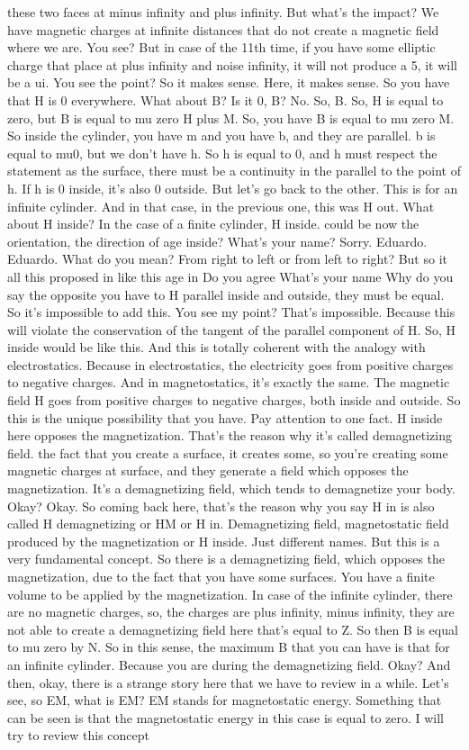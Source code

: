 these two faces at minus infinity and plus infinity. But what's the impact? We have magnetic charges at infinite distances that do not create a magnetic field where we are. You see? But in case of the 11th time, if you have some elliptic charge that place at plus infinity and noise infinity, it will not produce a 5, it will be a ui. You see the point? So it makes sense. Here, it makes sense. So you have that H is 0 everywhere. What about B? Is it 0, B? No. So, B. So, H is equal to zero, but B is equal to mu zero H plus M. So, you have B is equal to mu zero M. So inside the cylinder, you have m and you have b, and they are parallel. b is equal to mu0, but we don't have h. So h is equal to 0, and h must respect the statement as the surface, there must be a continuity in the parallel to the point of h. If h is 0 inside, it's also 0 outside. But let's go back to the other. This is for an infinite cylinder. And in that case, in the previous one, this was H out. What about H inside? In the case of a finite cylinder, H inside. could be now the orientation, the direction of age inside? What's your name? Sorry. Eduardo. Eduardo. What do you mean? From right to left or from left to right? But so it all this proposed in like this age in Do you agree What's your name Why do you say the opposite you have to H parallel inside and outside, they must be equal. So it's impossible to add this. You see my point? That's impossible. Because this will violate the conservation of the tangent of the parallel component of H. So, H inside would be like this. And this is totally coherent with the analogy with electrostatics. Because in electrostatics, the electricity goes from positive charges to negative charges. And in magnetostatics, it's exactly the same. The magnetic field H goes from positive charges to negative charges, both inside and outside. So this is the unique possibility that you have. Pay attention to one fact. H inside here opposes the magnetization. That's the reason why it's called demagnetizing field. the fact that you create a surface, it creates some, so you're creating some magnetic charges at surface, and they generate a field which opposes the magnetization. It's a demagnetizing field, which tends to demagnetize your body. Okay? Okay. So coming back here, that's the reason why you say H in is also called H demagnetizing or HM or H in. Demagnetizing field, magnetostatic field produced by the magnetization or H inside. Just different names. But this is a very fundamental concept. So there is a demagnetizing field, which opposes the magnetization, due to the fact that you have some surfaces. You have a finite volume to be applied by the magnetization. In case of the infinite cylinder, there are no magnetic charges, so, the charges are plus infinity, minus infinity, they are not able to create a demagnetizing field here that's equal to Z. So then B is equal to mu zero by N. So in this sense, the maximum B that you can have is that for an infinite cylinder. Because you are during the demagnetizing field. Okay? And then, okay, there is a strange story here that we have to review in a while. Let's see, so EM, what is EM? EM stands for magnetostatic energy. Something that can be seen is that the magnetostatic energy in this case is equal to zero. I will try to review this concept 